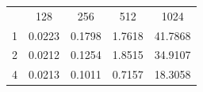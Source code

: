 \documentclass[a4paper,11pt]{article}
\begin{document}
\begin{center}
\begin{tabular}{c | c | c | c | c}
   & 128 & 256 & 512 & 1024 \\
1 & 0.0223 & 0.1798 & 1.7618 & 41.7868 \\
2 & 0.0212 & 0.1254 & 1.8515 & 34.9107 \\ 
4 & 0.0213 & 0.1011 & 0.7157 & 18.3058 \\
\end{tabular}
\vspace{1em}
\end{center}
\end{document}
